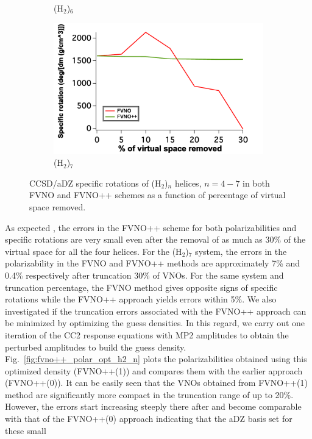 \begin{figure}
\begin{subfigure}{.5\textwidth}
  \caption{(H$_2$)$_6$}
  \label{fig:sfig2}
\end{subfigure}
\begin{subfigure}{.5\textwidth}
  \centering
  \includegraphics[width=.9\linewidth]{figures_fvno++/fvno++_h2_7_adz_optrot_lg.pdf}
  \caption{(H$_2$)$_7$}
  \label{fig:sfig2}
\end{subfigure}
\caption{{\footnotesize CCSD/aDZ  specific rotations of
(H$_2$)$_n$ helices, $ n = 4-7$ in both FVNO and FVNO++ schemes as a function of
percentage of virtual space removed.}}
\label{fig:fvno++_optrot_h2_n}
\end{figure}
As expected , the errors in the FVNO++ scheme for both polarizabilities and specific rotations are
very small even after the removal of as much as 30\% of the virtual space for all the four helices.
For the (H$_2$)$_7$ system, the errors in the polarizability in the FVNO and FVNO++ methods are 
approximately 7\% and 0.4\% respectively after truncation 30\% of VNOs. For the same system and truncation
percentage, the FVNO method gives opposite signs of specific rotations while the FVNO++ approach 
yields errors within 5\%. We also investigated if the truncation errors associated with the 
FVNO++ approach can be minimized by optimizing the guess densities. In this regard, we carry out 
one iteration of the CC2 response equations with MP2 amplitudes to obtain the perturbed amplitudes
to build the guess density. Fig.~\ref{fig:fvno++_polar_opt_h2_n} plots the polarizabilities 
obtained using this optimized density (FVNO++(1)) and compares them with the earlier approach (FVNO++(0)).
It can be easily seen that the VNOs obtained from FVNO++(1) method are significantly more 
compact in the truncation range of up to 20\%. However, the errors start increasing steeply there after
and become comparable with that of the FVNO++(0) approach indicating that the aDZ basis set for these small 
